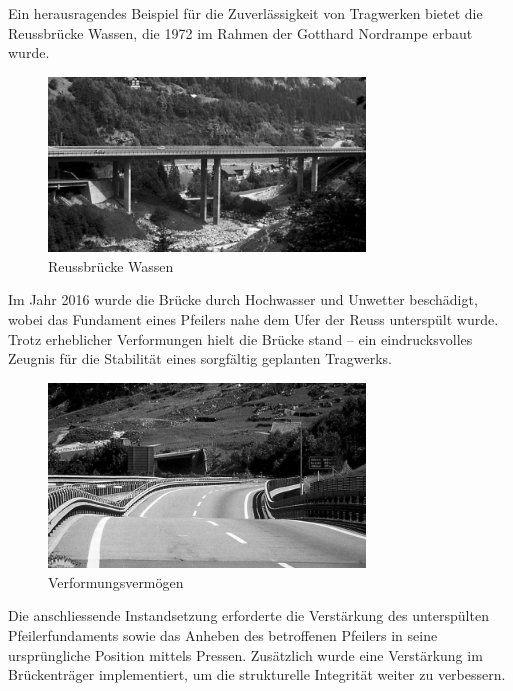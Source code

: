 Ein herausragendes Beispiel für die Zuverlässigkeit von Tragwerken bietet die Reussbrücke Wassen, die 1972 im Rahmen der Gotthard Nordrampe erbaut wurde. 
\begin{figure} [h]
	\centering
	\includegraphics[width=0.75\textwidth]{papers/balken/images/teil3/ReussbrueckeWassen1.jpg}
	\caption{Reussbrücke Wassen}
	\label{fig:Reussbrücke-Wassen}
\end{figure}
Im Jahr 2016 wurde die Brücke durch Hochwasser und Unwetter beschädigt, wobei das Fundament eines Pfeilers nahe dem Ufer der Reuss unterspült wurde. 
Trotz erheblicher Verformungen hielt die Brücke stand – ein eindrucksvolles Zeugnis für die Stabilität eines sorgfältig geplanten Tragwerks.
\begin{figure}
\begin{center}
\includegraphics[width=0.75\textwidth]{papers/balken/images/teil3/ReussbrueckeWassen2.jpg}
\end{center}
\caption{Verformungsvermögen}
\end{figure}
Die anschliessende Instandsetzung erforderte die Verstärkung des unterspülten Pfeilerfundaments sowie das Anheben des betroffenen Pfeilers in seine ursprüngliche Position mittels Pressen. 
Zusätzlich wurde eine Verstärkung im Brückenträger implementiert, um die strukturelle Integrität weiter zu verbessern. 
